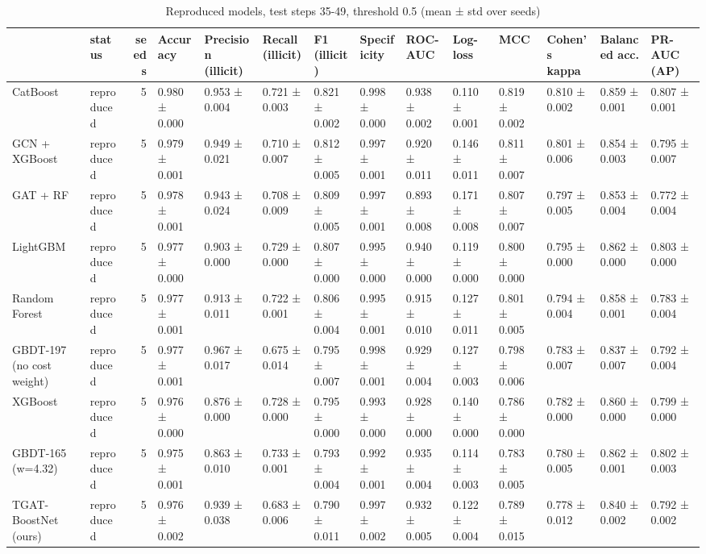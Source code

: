 \begin{table}
\caption{Reproduced models, test steps 35-49, threshold 0.5 (mean ± std over seeds)}
\label{tab:03_leaderboard}
\begin{tabular}{llrlllllllllll}
\toprule
 & status & seeds & Accuracy & Precision (illicit) & Recall (illicit) & F1 (illicit) & Specificity & ROC-AUC & Log-loss & MCC & Cohen's kappa & Balanced acc. & PR-AUC (AP) \\
\midrule
CatBoost & reproduced & 5 & 0.980 ± 0.000 & 0.953 ± 0.004 & 0.721 ± 0.003 & 0.821 ± 0.002 & 0.998 ± 0.000 & 0.938 ± 0.002 & 0.110 ± 0.001 & 0.819 ± 0.002 & 0.810 ± 0.002 & 0.859 ± 0.001 & 0.807 ± 0.001 \\
GCN + XGBoost & reproduced & 5 & 0.979 ± 0.001 & 0.949 ± 0.021 & 0.710 ± 0.007 & 0.812 ± 0.005 & 0.997 ± 0.001 & 0.920 ± 0.011 & 0.146 ± 0.011 & 0.811 ± 0.007 & 0.801 ± 0.006 & 0.854 ± 0.003 & 0.795 ± 0.007 \\
GAT + RF & reproduced & 5 & 0.978 ± 0.001 & 0.943 ± 0.024 & 0.708 ± 0.009 & 0.809 ± 0.005 & 0.997 ± 0.001 & 0.893 ± 0.008 & 0.171 ± 0.008 & 0.807 ± 0.007 & 0.797 ± 0.005 & 0.853 ± 0.004 & 0.772 ± 0.004 \\
LightGBM & reproduced & 5 & 0.977 ± 0.000 & 0.903 ± 0.000 & 0.729 ± 0.000 & 0.807 ± 0.000 & 0.995 ± 0.000 & 0.940 ± 0.000 & 0.119 ± 0.000 & 0.800 ± 0.000 & 0.795 ± 0.000 & 0.862 ± 0.000 & 0.803 ± 0.000 \\
Random Forest & reproduced & 5 & 0.977 ± 0.001 & 0.913 ± 0.011 & 0.722 ± 0.001 & 0.806 ± 0.004 & 0.995 ± 0.001 & 0.915 ± 0.010 & 0.127 ± 0.011 & 0.801 ± 0.005 & 0.794 ± 0.004 & 0.858 ± 0.001 & 0.783 ± 0.004 \\
GBDT-197 (no cost weight) & reproduced & 5 & 0.977 ± 0.001 & 0.967 ± 0.017 & 0.675 ± 0.014 & 0.795 ± 0.007 & 0.998 ± 0.001 & 0.929 ± 0.004 & 0.127 ± 0.003 & 0.798 ± 0.006 & 0.783 ± 0.007 & 0.837 ± 0.007 & 0.792 ± 0.004 \\
XGBoost & reproduced & 5 & 0.976 ± 0.000 & 0.876 ± 0.000 & 0.728 ± 0.000 & 0.795 ± 0.000 & 0.993 ± 0.000 & 0.928 ± 0.000 & 0.140 ± 0.000 & 0.786 ± 0.000 & 0.782 ± 0.000 & 0.860 ± 0.000 & 0.799 ± 0.000 \\
GBDT-165 (w=4.32) & reproduced & 5 & 0.975 ± 0.001 & 0.863 ± 0.010 & 0.733 ± 0.001 & 0.793 ± 0.004 & 0.992 ± 0.001 & 0.935 ± 0.004 & 0.114 ± 0.003 & 0.783 ± 0.005 & 0.780 ± 0.005 & 0.862 ± 0.001 & 0.802 ± 0.003 \\
TGAT-BoostNet (ours) & reproduced & 5 & 0.976 ± 0.002 & 0.939 ± 0.038 & 0.683 ± 0.006 & 0.790 ± 0.011 & 0.997 ± 0.002 & 0.932 ± 0.005 & 0.122 ± 0.004 & 0.789 ± 0.015 & 0.778 ± 0.012 & 0.840 ± 0.002 & 0.792 ± 0.002 \\

\end{tabular}
\end{table}
